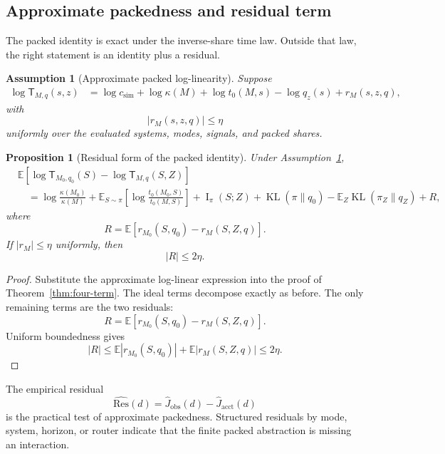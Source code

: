 \documentclass{article}
\newtheorem{assumption}{Assumption}
\newtheorem{proposition}{Proposition}
\DeclareMathOperator{\KL}{KL}
\DeclareMathOperator{\MI}{I}
\newcommand{\E}{\mathbb{E}}
\begin{document}
\subsection{Approximate packedness and residual term}

The packed identity is exact under the inverse-share time law.  Outside that law, the
right statement is an identity plus a residual.

\begin{assumption}[Approximate packed log-linearity]
\label{ass:app-approx-packed}
Suppose
\[
\begin{aligned}
    \log \mathsf T_{M,q}(s,z)
    &=
    \log c_{\mathrm{sim}}
    +
    \log\kappa(M)
    +
    \log t_0(M,s)
    -
    \log q_z(s)
    +
    r_M(s,z,q),
\end{aligned}
\]
with
\[
    |r_M(s,z,q)|\le \eta
\]
uniformly over the evaluated systems, modes, signals, and packed shares.
\end{assumption}

\begin{proposition}[Residual form of the packed identity]
\label{prop:app-residual-decomp}
Under Assumption~\ref{ass:app-approx-packed},
\[
\begin{aligned}
&\E[
    \log \mathsf T_{M_0,q_0}(S)
    -
    \log \mathsf T_{M,q}(S,Z)
]
\\
&\quad =
\log\frac{\kappa(M_0)}{\kappa(M)}
+
\E_{S\sim\pi}
\left[
    \log\frac{t_0(M_0,S)}{t_0(M,S)}
\right]
+
\MI_\pi(S;Z)
+
\KL(\pi\|q_0)
-
\E_Z\KL(\pi_Z\|q_Z)
+
R,
\end{aligned}
\]
where
\[
    R=
    \E[r_{M_0}(S,q_0)-r_M(S,Z,q)].
\]
If \(|r_M|\le\eta\) uniformly, then
\[
    |R|\le 2\eta.
\]
\end{proposition}

\begin{proof}
Substitute the approximate log-linear expression into the proof of
Theorem~\ref{thm:four-term}.  The ideal terms decompose exactly as before.  The only
remaining terms are the two residuals:
\[
    R=
    \E[r_{M_0}(S,q_0)-r_M(S,Z,q)].
\]
Uniform boundedness gives
\[
    |R|
    \le
    \E|r_{M_0}(S,q_0)|+\E|r_M(S,Z,q)|
    \le 2\eta.
\]
\end{proof}

The empirical residual
\[
    \widehat{\mathrm{Res}}(d)
    =
    \widehat J_{\mathrm{obs}}(d)-\widehat J_{\mathrm{acct}}(d)
\]
is the practical test of approximate packedness.  Structured residuals by mode, system,
horizon, or router indicate that the finite packed abstraction is missing an interaction.
\end{document}

